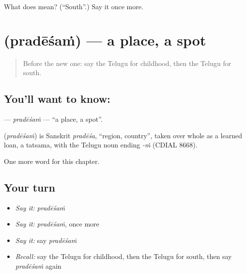 \begin{tcolorbox}[breakable,colback=teal!4,colframe=teal!35!black,title={Before you move on}]
What does  mean? (\textquotedblleft{}South\textquotedblright{}.) Say it once more.
\end{tcolorbox}
\section[\texorpdfstring{\te{ప్రదేశం} (pradēśaṁ)}{ప్రదేశం (pradēśaṁ)}]{ (pradēśaṁ) — a place, a spot}

\label{lesson:TE-C291-pradesam}



\begin{quote}
Before the new one: say the Telugu for childhood, then the Telugu for south.
\end{quote}

\subsection*{You'll want to know: }
\textbf{} — \emph{pradēśaṁ} — \textquotedblleft{}a place, a spot\textquotedblright{}.

\begin{cousinweb}
\textbf{} (\emph{pradēśaṁ}) is Sanskrit \emph{pradēśa}, \textquotedblleft{}region, country\textquotedblright{}, taken over whole as a learned loan, a tatsama, with the Telugu noun ending \emph{-ṁ} (CDIAL 8668).
\end{cousinweb}

\begin{grammarlens}[title={What you've built}]
One more word for this chapter.
\end{grammarlens}

\subsection*{Your turn}
\begin{itemize}
\raggedright
  \item \emph{Say it:} \emph{pradēśaṁ}
  \item \emph{Say it:} \emph{pradēśaṁ}, once more
  \item \emph{Say it:} say \emph{pradēśaṁ}
  \item \emph{Recall:} say the Telugu for childhood, then the Telugu for south, then say \emph{pradēśaṁ} again
\end{itemize}

